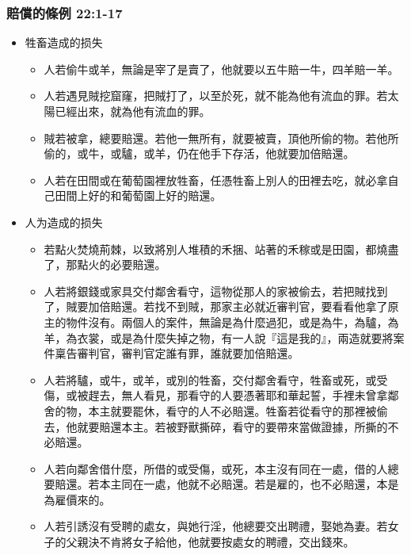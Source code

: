 \subsubsection{賠償的條例 22:1-17}
\begin{itemize} 
\itemsep-.35em
\item 牲畜造成的损失
\begin{itemize} 
\itemsep-.35em
\item 人若偷牛或羊，無論是宰了是賣了，他就要以五牛賠一牛，四羊賠一羊。
\item 人若遇見賊挖窟窿，把賊打了，以至於死，就不能為他有流血的罪。若太陽已經出來，就為他有流血的罪。
\item 賊若被拿，總要賠還。若他一無所有，就要被賣，頂他所偷的物。若他所偷的，或牛，或驢，或羊，仍在他手下存活，他就要加倍賠還。
\item 人若在田間或在葡萄園裡放牲畜，任憑牲畜上別人的田裡去吃，就必拿自己田間上好的和葡萄園上好的賠還。
\end{itemize}
\item 人为造成的损失
\begin{itemize} 
\itemsep-.35em
\item 若點火焚燒荊棘，以致將別人堆積的禾捆、站著的禾稼或是田園，都燒盡了，那點火的必要賠還。
\item 人若將銀錢或家具交付鄰舍看守，這物從那人的家被偷去，若把賊找到了，賊要加倍賠還。若找不到賊，那家主必就近審判官，要看看他拿了原主的物件沒有。兩個人的案件，無論是為什麼過犯，或是為牛，為驢，為羊，為衣裳，或是為什麼失掉之物，有一人說『這是我的』，兩造就要將案件稟告審判官，審判官定誰有罪，誰就要加倍賠還。
\item 人若將驢，或牛，或羊，或別的牲畜，交付鄰舍看守，牲畜或死，或受傷，或被趕去，無人看見，那看守的人要憑著耶和華起誓，手裡未曾拿鄰舍的物，本主就要罷休，看守的人不必賠還。牲畜若從看守的那裡被偷去，他就要賠還本主。若被野獸撕碎，看守的要帶來當做證據，所撕的不必賠還。
\item 人若向鄰舍借什麼，所借的或受傷，或死，本主沒有同在一處，借的人總要賠還。若本主同在一處，他就不必賠還。若是雇的，也不必賠還，本是為雇價來的。
\item 人若引誘沒有受聘的處女，與她行淫，他總要交出聘禮，娶她為妻。若女子的父親決不肯將女子給他，他就要按處女的聘禮，交出錢來。
\end{itemize}
\end{itemize}

